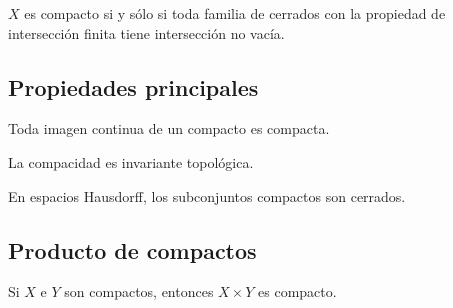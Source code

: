 \begin{proposición}
    $X$ es compacto si y sólo si toda familia de cerrados con la propiedad de intersección finita tiene intersección no vacía.
\end{proposición}

\subsection{Propiedades principales}

\begin{proposición}
    Toda imagen continua de un compacto es compacta.
\end{proposición}

\begin{corolario}
    La compacidad es invariante topológica.
\end{corolario}

\begin{proposición}
    En espacios Hausdorff, los subconjuntos compactos son cerrados.
\end{proposición}

\subsection{Producto de compactos}

\begin{teorema}
    Si $X$ e $Y$ son compactos, entonces $X\times Y$ es compacto.
\end{teorema}
